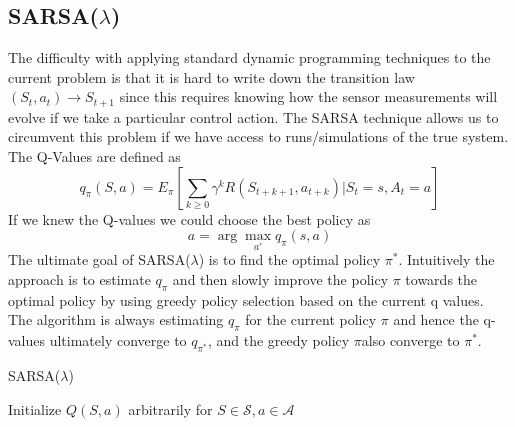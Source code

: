 \documentclass{article}
\begin{document}
\subsection{SARSA($\lambda$)}
\label{discrete_sarsa}
The difficulty with applying standard dynamic programming techniques to the current problem is that it is hard to write down the transition law $(S_t,a_t) \to S_{t+1}$ since this requires knowing how the sensor measurements will evolve if we take a particular control action. The SARSA technique allows us to circumvent this problem if we have access to runs/simulations of the true system. The Q-Values are defined as 
%
%
\begin{equation}
q_{\pi}(S,a) = E_{\pi} \left[ \sum_{k \geq 0} \gamma^k R(S_{t+k+1}, a_{t+k}) | S_t = s, A_t = a \right]
\end{equation}
%
%
If we knew the Q-values we could choose the best policy as 
%
\begin{equation}
\label{q-policy}
a = \arg \max_{a'} q_{\pi}(s,a) 
\end{equation}
%
The ultimate goal of SARSA($\lambda$) is to find the optimal policy $\pi^*$. Intuitively the approach is to estimate $q_{\pi}$ and then slowly improve the policy $\pi$ towards the optimal policy by using greedy policy selection based on the current q values. The algorithm is always estimating $q_{\pi}$ for the current policy $\pi$ and hence the q-values ultimately converge to $q_{\pi^*}$, and the greedy policy $\pi$also converge to $\pi^*$.

\begin{algorithm}[H]
   \caption{SARSA($\lambda$)}
   \label{alg:SARSA}
\begin{algorithmic}
   \STATE Initialize $Q(S,a)$ arbitrarily for $S \in \mathcal{S}, a \in \mathcal{A}$
   \REPEAT

\end{algorithmic}
\end{algorithm}
\end{document}
